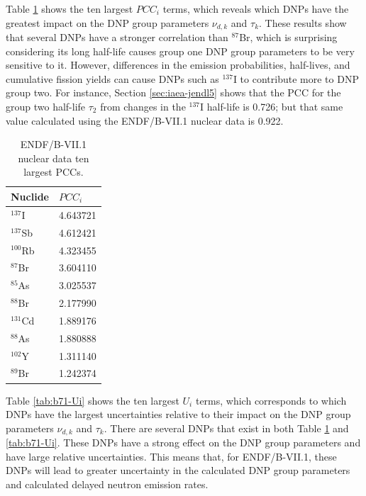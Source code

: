 Table \ref{tab:b71-PCCi} shows the ten largest $PCC_i$ terms, which reveals which \glspl{DNP} have the greatest impact on the \gls{DNP} group parameters $\nu_{d,k}$ and $\tau_k$.
These results show that several \glspl{DNP} have a stronger correlation than $^{87}$Br, which is surprising considering its long half-life causes group one \gls{DNP} group parameters to be very sensitive to it.
However, differences in the emission probabilities, half-lives, and cumulative fission yields can cause \glspl{DNP} such as $^{137}$I to contribute more to \gls{DNP} group two.
For instance, Section \ref{sec:iaea-jendl5} shows that the \gls{PCC} for the group two half-life $\tau_2$ from changes in the $^{137}$I half-life is 0.726; but that same value calculated using the ENDF/B-VII.1 nuclear data is 0.922.

\begin{table}[]
    \centering
    \caption{ENDF/B-VII.1 nuclear data ten largest \glspl{PCC}.}
    \begin{tabular}{ll}
        \hline
       Nuclide & $PCC_{i}$ \\
       \hline
       $^{137}$I & 4.643721 \\
       $^{137}$Sb & 4.612421 \\
       $^{100}$Rb & 4.323455 \\
       $^{87}$Br & 3.604110 \\
       $^{85}$As & 3.025537 \\
       $^{88}$Br & 2.177990 \\
       $^{131}$Cd & 1.889176 \\
       $^{88}$As & 1.880888 \\
       $^{102}$Y & 1.311140 \\
       $^{89}$Br & 1.242374 \\
        \hline
    \end{tabular}
    \label{tab:b71-PCCi}
\end{table}

Table \ref{tab:b71-Ui} shows the ten largest $U_i$ terms, which corresponds to which \glspl{DNP} have the largest uncertainties relative to their impact on the \gls{DNP} group parameters $\nu_{d,k}$ and $\tau_k$.
There are several \glspl{DNP} that exist in both Table \ref{tab:b71-PCCi} and \ref{tab:b71-Ui}.
These \glspl{DNP} have a strong effect on the \gls{DNP} group parameters and have large relative uncertainties.
This means that, for ENDF/B-VII.1, these \glspl{DNP} will lead to greater uncertainty in the calculated \gls{DNP} group parameters and calculated delayed neutron emission rates. 

